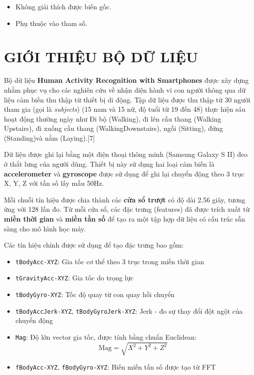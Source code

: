 \documentclass[
]{article}
\providecommand{\tightlist}{%
  \setlength{\itemsep}{0pt}\setlength{\parskip}{0pt}}
\begin{document}
\begin{itemize}
\tightlist
\item
  Không giải thích được biến gốc.
\item
  Phụ thuộc vào tham số.
\end{itemize}

\newpage

\section{GIỚI THIỆU BỘ DỮ
LIỆU}\label{giux1edbi-thiux1ec7u-bux1ed9-dux1eef-liux1ec7u}

Bộ dữ liệu \textbf{Human Activity Recognition with Smartphones} được xây
dựng nhằm phục vụ cho các nghiên cứu về nhận diện hành vi con người
thông qua dữ liệu cảm biến thu thập từ thiết bị di động. Tập dữ liệu
được thu thập từ 30 người tham gia (gọi là \emph{subjects}) (15 nam và
15 nữ, độ tuổi từ 19 đến 48) thực hiện sáu hoạt động thường ngày như Đi
bộ (Walking), đi lên cầu thang (Walking Upstairs), đi xuống cầu thang
(WalkingDownstairs), ngồi (Sitting), đứng (Standing)và nằm
(Laying).{[}7{]}

Dữ liệu được ghi lại bằng một điện thoại thông minh (Samsung Galaxy S
II) đeo ở thắt lưng của người dùng. Thiết bị này sử dụng hai loại cảm
biến là \textbf{accelerometer} và \textbf{gyroscope} được sử dụng để ghi
lại chuyển động theo 3 trục X, Y, Z với tần số lấy mẫu 50Hz.

Mỗi chuỗi tín hiệu được chia thành các \textbf{cửa sổ trượt} có độ dài
2.56 giây, tương ứng với 128 lần đo. Từ mỗi cửa sổ, các đặc trưng
(features) đã được trích xuất từ \textbf{miền thời gian} và \textbf{miền
tần số} để tạo ra một tập hợp dữ liệu có cấu trúc sẵn sàng cho mô hình
học máy.

Các tín hiệu chính được sử dụng để tạo đặc trưng bao gồm:

\begin{itemize}
\tightlist
\item
  \texttt{tBodyAcc-XYZ}: Gia tốc cơ thể theo 3 trục trong miền thời
  gian\\
\item
  \texttt{tGravityAcc-XYZ}: Gia tốc do trọng lực\\
\item
  \texttt{tBodyGyro-XYZ}: Tốc độ quay từ con quay hồi chuyển\\
\item
  \texttt{tBodyAccJerk-XYZ}, \texttt{tBodyGyroJerk-XYZ}: Jerk - đo sự
  thay đổi đột ngột của chuyển động\\
\item
  \texttt{Mag}: Độ lớn vector gia tốc, được tính bằng chuẩn Euclidean:\\
  \[
  \text{Mag} = \sqrt{X^2 + Y^2 + Z^2}
  \]
\item
  \texttt{fBodyAcc-XYZ}, \texttt{fBodyGyro-XYZ}: Biến miền tần số được
  tạo từ FFT
\end{itemize}
\end{document}
